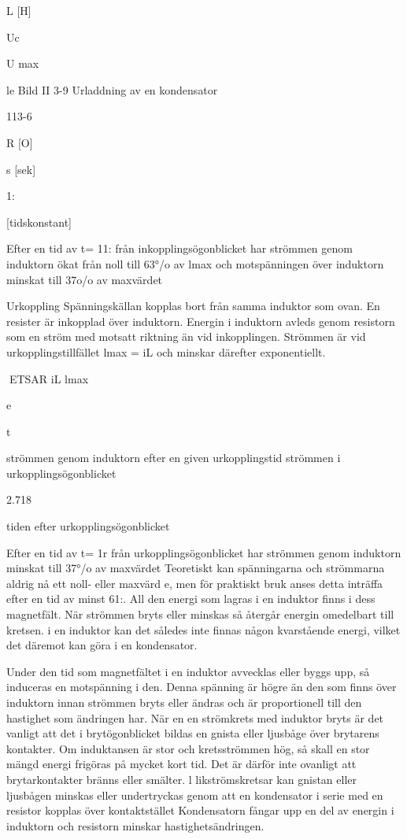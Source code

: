 L [H]

Uc

U max

le
Bild II 3-9 Urladdning av en kondensator

113-6

R [O]

s [sek]

1:

[tidskonstant]

Efter en tid av t= 11: från inkopplingsögonblicket har strömmen genom induktorn
ökat från noll till 63°/o av lmax och motspänningen över induktorn minskat till 37o/o
av maxvärdet

Urkoppling
Spänningskällan kopplas bort från samma
induktor som ovan. En resister är inkopplad
över induktorn. Energin i induktorn avleds
genom resistorn som en ström med motsatt
riktning än vid inkopplingen. Strömmen är
vid urkopplingstillfället lmax = iL och minskar
därefter exponentiellt.

ETSAR
iL
lmax

e

t

strömmen genom induktorn efter en
given urkopplingstid
strömmen i urkopplingsögonblicket

2.718

tiden efter urkopplingsögonblicket

Efter en tid av t= 1r från urkopplingsögonblicket har strömmen genom induktorn
minskat till 37°/o av maxvärdet
Teoretiskt kan spänningarna och strömmarna aldrig nå ett noll- eller maxvärd e, men
för praktiskt bruk anses detta inträffa efter en
tid av minst 61:.
All den energi som lagras i en induktor
finns i dess magnetfält. När strömmen bryts
eller minskas så återgår energin omedelbart
till kretsen. i en induktor kan det således inte
finnas någon kvarstående energi, vilket det
däremot kan göra i en kondensator.

Under den tid som magnetfältet i en induktor avvecklas eller byggs upp, så induceras en motspänning i den. Denna spänning
är högre än den som finns över induktorn
innan strömmen bryts eller ändras och är
proportionell till den hastighet som ändringen har. När en en strömkrets med induktor
bryts är det vanligt att det i brytögonblicket
bildas en gnista eller ljusbåge över brytarens
kontakter.
Om induktansen är stor och kretsströmmen hög, så skall en stor mängd energi
frigöras på mycket kort tid. Det är därför inte
ovanligt att brytarkontakter bränns eller smälter. l likströmskretsar kan gnistan eller ljusbågen minskas eller undertryckas genom att
en kondensator i serie med en resistor kopplas över kontaktstället Kondensatorn fångar
upp en del av energin i induktorn och resistorn minskar hastighetsändringen.

